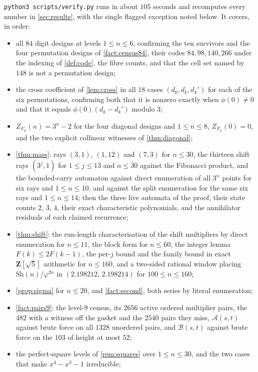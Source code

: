 \documentclass[11pt]{amsart}
\theoremstyle{definition}
\theoremstyle{remark}
\begin{document}
\texttt{python3 scripts/verify.py} runs in about $105$ seconds and recomputes every number in \cref{sec:results}, with the single flagged exception noted below. It covers, in order:
\begin{itemize}
\item all $84$ digit designs at levels $1\le n\le 6$, confirming the ten survivors and the four permutation designs of \cref{fact:census84}, their codes $84,98,140,266$ under the indexing of \cref{def:code}, the fibre counts, and that the cell set named by $148$ is not a permutation design;
\item the cross coefficient of \cref{lem:cross} in all $18$ cases $(d_0,d_k,d_k')$ for each of the six permutations, confirming both that it is nonzero exactly when $\phi(0)\neq 0$ and that it equals $\phi(0)(d_k-d_k')$ modulo $3$;
\item $Z_{F_\phi}(n)=3^n-2$ for the four diagonal designs and $1\le n\le 8$, $Z_{F_\phi}(0)=0$, and the two explicit collinear witnesses of \cref{thm:diagonal};
\item \cref{thm:mass}: rays $(3,1)$, $(1,12)$ and $(7,3)$ for $n\le 30$, the thirteen shift rays $(3^j,1)$ for $1\le j\le 13$ and $n\le 30$ against the Fibonacci product, and the bounded-carry automaton against direct enumeration of all $3^n$ points for six rays and $1\le n\le 10$, and against the split enumeration for the same six rays and $1\le n\le 14$; then the three live automata of the proof, their state counts $2$, $3$, $4$, their exact characteristic polynomials, and the annihilator residuals of each claimed recurrence;
\item \cref{thm:shift}: the run-length characterisation of the shift multipliers by direct enumeration for $n\le 11$, the block form for $n\le 60$, the integer lemma $F(k)\le 2F(k-1)$, the per-$j$ bound and the family bound in exact $\mathbf{Z}[\sqrt5]$ arithmetic for $n\le 160$, and a two-sided rational window placing $\mathrm{Sh}(n)/\varphi^{2n}$ in $(2.198212,\,2.198214)$ for $100\le n\le 160$;
\item \cref{prop:sigma} for $n\le 20$, and \cref{fact:second}, both series by literal enumeration;
\item \cref{fact:pairs9}: the level-$9$ census, its $2656$ active ordered multiplier pairs, the $482$ with a witness off the gasket and the $2540$ pairs they miss, $\mathcal{A}(s,t)$ against brute force on all $1328$ unordered pairs, and $\mathcal{B}(s,t)$ against brute force on the $103$ of height at most $52$;
\item the perfect-square levels of \cref{rem:squares} over $1\le n\le 30$, and the two cases that make $x^4-x^3-1$ irreducible;

\end{itemize}
\end{document}
